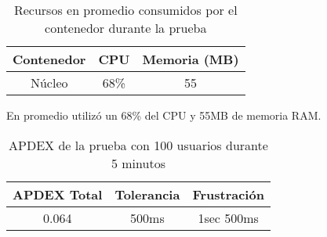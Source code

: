 \begin{table}[]
    \centering
    \makegapedcells
    \begin{tabular}{|c|c|c}
    \hline
    Contenedor & CPU & Memoria (MB)\\ \hline
    Núcleo & 68\% & 55 \\ \hline
    \end{tabular}
    \caption{Recursos en promedio consumidos por el contenedor durante la prueba}
    \label{tab:tabla_planes}
\end{table}

En promedio utilizó un 68\% del CPU y 55MB de memoria RAM.

\begin{table}[]
    \centering
    \makegapedcells
    \begin{tabular}{|c|c|c}
    \hline
    APDEX Total & Tolerancia & Frustración\\ \hline
    0.064 & 500ms & 1sec 500ms \\ \hline
    \end{tabular}
    \caption{APDEX de la prueba con 100 usuarios durante 5 minutos}
    \label{tab:tabla_planes}
\end{table}


